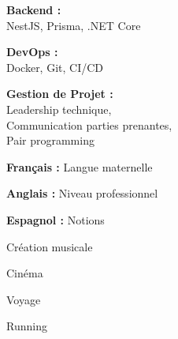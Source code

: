\documentclass[a4paper,11pt]{article}
\begin{document}
\begin{cv}[profile][2]
\cvseparator[2]
\begin{cvitem}
    \textbf{Backend :} \\
    NestJS, Prisma, .NET Core
\end{cvitem}

\cvseparator[2]
\begin{cvitem}
    \textbf{DevOps :} \\
    Docker, Git, CI/CD
\end{cvitem}

\cvseparator[2]
\begin{cvitem}
    \textbf{Gestion de Projet :} \\
    Leadership technique, \\
    Communication parties prenantes, \\
    Pair programming
\end{cvitem}

\begin{cvitem}
    \textbf{Français :} Langue maternelle
\end{cvitem}

\cvseparator
\begin{cvitem}
    \textbf{Anglais :} Niveau professionnel
\end{cvitem}

\cvseparator
\begin{cvitem}
    \textbf{Espagnol :} Notions
\end{cvitem}

\begin{cvitem}
    Création musicale
\end{cvitem}

\cvseparator
\begin{cvitem}
    Cinéma
\end{cvitem}

\cvseparator
\begin{cvitem}
    Voyage
\end{cvitem}

\cvseparator
\begin{cvitem}
    Running
\end{cvitem}

\end{cv}
\end{document}
